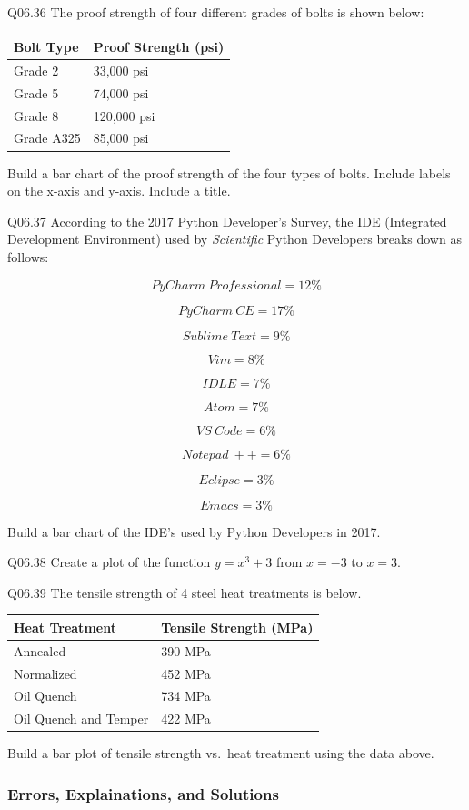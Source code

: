 \documentclass{book}
\newenvironment{problems}{}{}  %
\begin{document}
\begin{problems}
Q06.36 The proof strength of four different grades of bolts is shown
below:

\begin{longtable}[]{@{}ll@{}}
\toprule
Bolt Type & Proof Strength (psi)\tabularnewline
\midrule
\endhead
Grade 2 & 33,000 psi\tabularnewline
Grade 5 & 74,000 psi\tabularnewline
Grade 8 & 120,000 psi\tabularnewline
Grade A325 & 85,000 psi\tabularnewline
\bottomrule
\end{longtable}

Build a bar chart of the proof strength of the four types of bolts.
Include labels on the x-axis and y-axis. Include a title.

Q06.37 According to the 2017 Python Developer's Survey, the IDE
(Integrated Development Environment) used by \emph{Scientific} Python
Developers breaks down as follows:

\[ PyCharm \ Professional = 12\% \]

\[ PyCharm \ CE = 17\% \]

\[ Sublime \ Text = 9\% \]

\[ Vim = 8\% \]

\[ IDLE = 7\% \]

\[ Atom = 7\% \]

\[ VS \ Code = 6\% \]

\[ Notepad \ ++ = 6\% \]

\[ Eclipse = 3\% \]

\[ Emacs = 3\% \]

Build a bar chart of the IDE's used by Python Developers in 2017.

Q06.38 Create a plot of the function \(y=x^3+3\) from \(x=-3\) to
\(x=3\).

Q06.39 The tensile strength of 4 steel heat treatments is below.

\begin{longtable}[]{@{}ll@{}}
\toprule
Heat Treatment & Tensile Strength (MPa)\tabularnewline
\midrule
\endhead
Annealed & 390 MPa\tabularnewline
Normalized & 452 MPa\tabularnewline
Oil Quench & 734 MPa\tabularnewline
Oil Quench and Temper & 422 MPa\tabularnewline
\bottomrule
\end{longtable}

Build a bar plot of tensile strength vs.~heat treatment using the data
above.
        \end{problems}

    




    
        \subsubsection{Errors, Explainations, and
Solutions}\label{errors-explainations-and-solutions}
\end{document}
